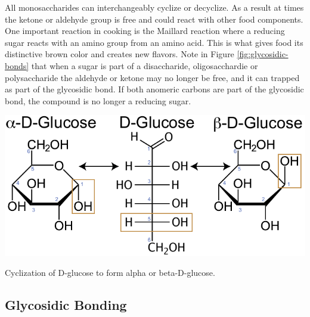 \documentclass{tufte-handout}
\begin{document}
  All monosaccharides can interchangeably cyclize or decyclize.  As a result at times the ketone or aldehyde group is free and could react with other food components.  One important reaction in cooking is the Maillard reaction where a reducing sugar reacts with an amino group from an amino acid.  This is what gives food its distinctive brown color and creates new flavors.  Note in Figure \ref{fig:glycosidic-bonds} that when a sugar is part of a disaccharide, oligosacchardie or polysaccharide the aldehyde or ketone may no longer be free, and it can trapped as part of the glycosidic bond.  If both anomeric carbons are part of the glycosidic bond, the compound is no longer a reducing sugar.


\begin{marginfigure}
\includegraphics{figures/Glucose-ab.pdf}
\caption{Cyclization of D-glucose to form alpha or beta-D-glucose.}
\label{fig:sugar-ab}
\end{marginfigure}


\subsection{Glycosidic Bonding}
\end{document}
